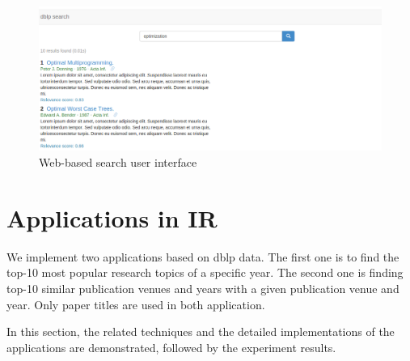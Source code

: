 \documentclass{sig-alternate-05-2015}
\begin{document}
\begin{figure}[th]
\centering
\includegraphics[width=.8\textwidth]{img/search}
\caption{Web-based search user interface}
\label{fig:search}
\end{figure}

\section{Applications in IR}
We implement two applications based on dblp data. The first one is to find the top-10 most popular research topics of a specific year. The second one is finding top-10 similar publication venues and years with a given publication venue and year. Only paper titles are used in both application.

In this section, the related techniques and the detailed implementations of the applications are demonstrated, followed by the experiment results.
\end{document}
